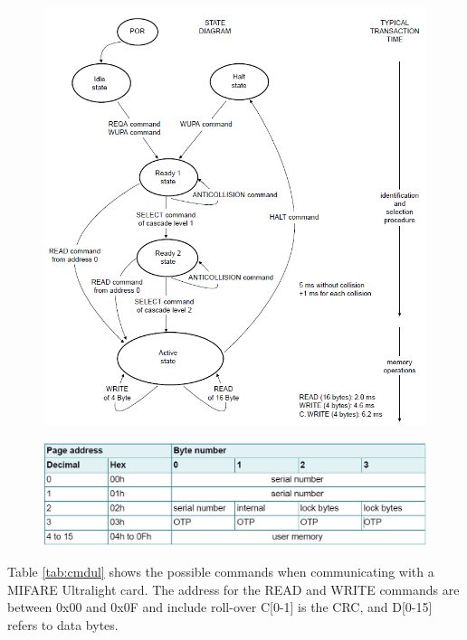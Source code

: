 \documentclass[fleqn,10pt]{SelfArx} %
\begin{document}
\begin{figure}[h]
\centering
\begin{minipage}[b]{.47\textwidth}
  \centering
  \includegraphics[width=\textwidth]{img/fsmul.png}
  \label{fig:fsmul}
\end{minipage}
\begin{minipage}[b]{.47\textwidth}
  \centering
  \includegraphics[width=\textwidth]{img/memul.png}
  \label{fig:memul}
\end{minipage}
\end{figure}

\noindent Table \ref{tab:cmdul} shows the possible commands when communicating with a MIFARE Ultralight card. The address for the READ and WRITE commands are between 0x00 and 0x0F and include roll-over  C[0-1] is the CRC, and D[0-15] refers to data bytes.
\end{document}

